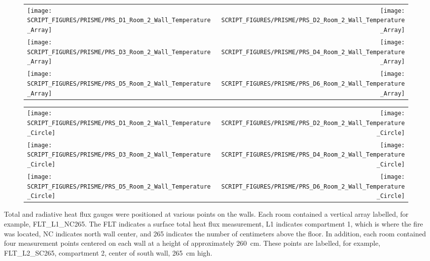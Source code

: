 \begin{figure}[p]
\begin{tabular*}{\textwidth}{l@{\extracolsep{\fill}}r}
\texttt{[image: SCRIPT\_FIGURES/PRISME/PRS\_D1\_Room\_2\_Wall\_Temperature\_Array]} &
\texttt{[image: SCRIPT\_FIGURES/PRISME/PRS\_D2\_Room\_2\_Wall\_Temperature\_Array]} \\
\texttt{[image: SCRIPT\_FIGURES/PRISME/PRS\_D3\_Room\_2\_Wall\_Temperature\_Array]} &
\texttt{[image: SCRIPT\_FIGURES/PRISME/PRS\_D4\_Room\_2\_Wall\_Temperature\_Array]} \\
\texttt{[image: SCRIPT\_FIGURES/PRISME/PRS\_D5\_Room\_2\_Wall\_Temperature\_Array]} &
\texttt{[image: SCRIPT\_FIGURES/PRISME/PRS\_D6\_Room\_2\_Wall\_Temperature\_Array]}
\end{tabular*}
\label{PRISME_Wall_Array_Room_2}
\end{figure}

\begin{figure}[p]
\begin{tabular*}{\textwidth}{l@{\extracolsep{\fill}}r}
\texttt{[image: SCRIPT\_FIGURES/PRISME/PRS\_D1\_Room\_2\_Wall\_Temperature\_Circle]} &
\texttt{[image: SCRIPT\_FIGURES/PRISME/PRS\_D2\_Room\_2\_Wall\_Temperature\_Circle]} \\
\texttt{[image: SCRIPT\_FIGURES/PRISME/PRS\_D3\_Room\_2\_Wall\_Temperature\_Circle]} &
\texttt{[image: SCRIPT\_FIGURES/PRISME/PRS\_D4\_Room\_2\_Wall\_Temperature\_Circle]} \\
\texttt{[image: SCRIPT\_FIGURES/PRISME/PRS\_D5\_Room\_2\_Wall\_Temperature\_Circle]} &
\texttt{[image: SCRIPT\_FIGURES/PRISME/PRS\_D6\_Room\_2\_Wall\_Temperature\_Circle]}
\end{tabular*}
\label{PRISME_Wall_Circle_Room_2}
\end{figure}

\clearpage

Total and radiative heat flux gauges were positioned at various points on the walls. Each room contained a vertical array labelled, for example, FLT\_L1\_NC265. The FLT indicates a surface total heat flux measurement, L1 indicates compartment 1, which is where the fire was located, NC indicates north wall center, and 265 indicates the number of centimeters above the floor. In addition, each room contained four measurement points centered on each wall at a height of approximately 260~cm. These points are labelled, for example, FLT\_L2\_SC265, compartment 2, center of south wall, 265~cm high.

